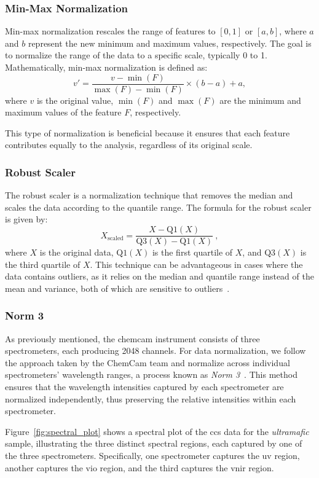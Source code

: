 \subsubsection{Min-Max Normalization}\label{subsec:min-max}
Min-max normalization rescales the range of features to $[0, 1]$ or $[a, b]$, where $a$ and $b$ represent the new minimum and maximum values, respectively.
The goal is to normalize the range of the data to a specific scale, typically 0 to 1.
Mathematically, min-max normalization is defined as:
$$
	v' = \frac{v - \min(F)}{\max(F) - \min(F)} \times (b - a) + a,
$$
where $v$ is the original value, $\min(F)$ and $\max(F)$ are the minimum and maximum values of the feature $F$, respectively.

This type of normalization is beneficial because it ensures that each feature contributes equally to the analysis, regardless of its original scale.

\subsubsection{Robust Scaler}
The robust scaler is a normalization technique that removes the median and scales the data according to the quantile range.
The formula for the robust scaler is given by:
$$
X_{\text{scaled}} = \frac{X - \text{Q1}(X)}{\text{Q3}(X) - \text{Q1}(X)} \: ,
$$
where $X$ is the original data, $\text{Q1}(X)$ is the first quartile of $X$, and $\text{Q3}(X)$ is the third quartile of $X$.
This technique can be advantageous in cases where the data contains outliers, as it relies on the median and quantile range instead of the mean and variance, both of which are sensitive to outliers~\cite{Vasques2024}.

\subsubsection{Norm 3}
As previously mentioned, the \gls{chemcam} instrument consists of three spectrometers, each producing 2048 channels.
For data normalization, we follow the approach taken by the ChemCam team and normalize across individual spectrometers' wavelength ranges, a process known as \textit{Norm 3}~\cite{cleggRecalibrationMarsScience2017, andersonImprovedAccuracyQuantitative2017}.
This method ensures that the wavelength intensities captured by each spectrometer are normalized independently, thus preserving the relative intensities within each spectrometer.

Figure~\ref{fig:spectral_plot} shows a spectral plot of the \gls{ccs} data for the \textit{ultramafic} sample, illustrating the three distinct spectral regions, each captured by one of the three spectrometers.
Specifically, one spectrometer captures the \gls{uv} region, another captures the \gls{vio} region, and the third captures the \gls{vnir} region.

